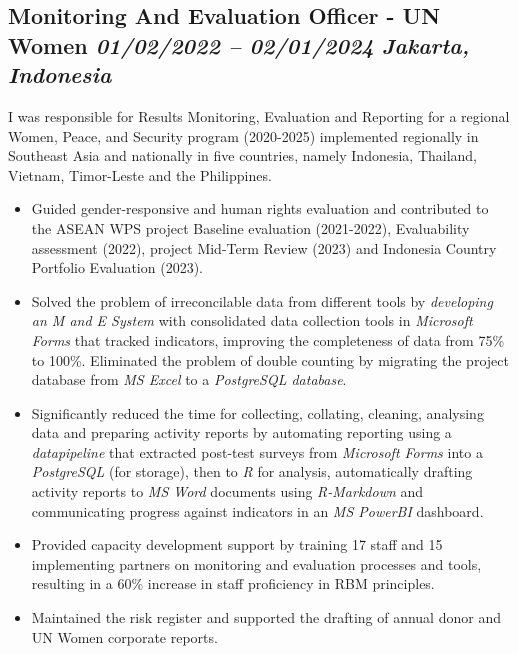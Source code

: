 \documentclass[
  10pt,
]{article}
\providecommand{\tightlist}{%
  \setlength{\itemsep}{0pt}\setlength{\parskip}{0pt}}
\begin{document}
\subsection{\texorpdfstring{Monitoring And Evaluation Officer - UN Women
\emph{01/02/2022 -- 02/01/2024} \textbar{} \emph{Jakarta, Indonesia}}{Monitoring And Evaluation Officer - UN Women 01/02/2022 -- 02/01/2024 \textbar{} Jakarta, Indonesia}}\label{monitoring-and-evaluation-officer---un-women-01022022-02012024-jakarta-indonesia}

I was responsible for Results Monitoring, Evaluation and Reporting for a regional Women, Peace, and Security program (2020-2025) implemented regionally in Southeast Asia and nationally in five countries, namely Indonesia, Thailand, Vietnam, Timor-Leste and the Philippines.

\begin{itemize}
\tightlist
\item
Guided gender-responsive and human rights evaluation and contributed to the ASEAN WPS project Baseline evaluation (2021-2022), Evaluability assessment (2022), project Mid-Term Review (2023) and Indonesia Country Portfolio Evaluation (2023).
\item
Solved the problem of irreconcilable data from different tools by \emph{developing an M and E System} with consolidated data collection tools in \emph{Microsoft Forms} that tracked indicators, improving the completeness of data from 75\% to 100\%. Eliminated the problem of double counting by migrating the project database from \emph{MS Excel} to a \emph{PostgreSQL database}.
\item
Significantly reduced the time for collecting, collating, cleaning, analysing data and preparing activity reports by automating reporting using a \emph{datapipeline} that extracted post-test surveys from \emph{Microsoft Forms} into a \emph{PostgreSQL} (for storage), then to \emph{R} for analysis, automatically drafting activity reports to \emph{MS Word} documents using \emph{R-Markdown} and communicating progress against indicators in an \emph{MS PowerBI} dashboard.
\item
Provided capacity development support by training 17 staff and 15 implementing partners on monitoring and evaluation processes and tools, resulting in a 60\% increase in staff proficiency in RBM principles.
\item
Maintained the risk register and supported the drafting of annual donor and UN Women corporate reports.
\end{itemize}
\end{document}
